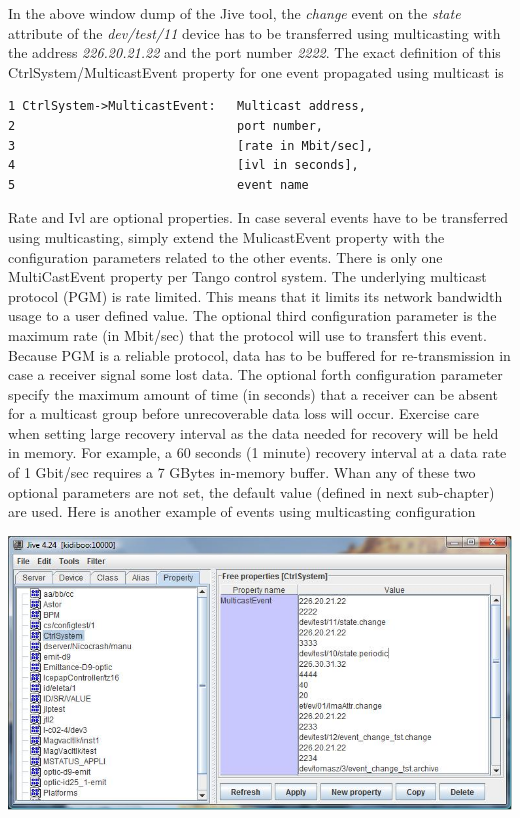 In the above window dump of the Jive tool, the \emph{change} event
on the \emph{state} attribute of the \emph{dev/test/11} device has
to be transferred using multicasting with the address \emph{226.20.21.22}
and the port number \emph{2222}. The exact definition of this CtrlSystem/MulticastEvent
property for one event propagated using multicast is


\begin{verbatim}
1 CtrlSystem->MulticastEvent:   Multicast address,
2                               port number,
3                               [rate in Mbit/sec],
4                               [ivl in seconds],
5                               event name
\end{verbatim}


Rate and Ivl are optional properties. In
case several events have to be transferred using multicasting, simply
extend the MulicastEvent property with the configuration parameters
related to the other events. There is only one MultiCastEvent property
per Tango control system. The underlying multicast protocol (PGM)
is rate limited. This means that it limits its network bandwidth usage
to a user defined value. The optional third configuration parameter
is the maximum rate (in Mbit/sec) that the protocol will use to transfert
this event. Because PGM is a reliable protocol, data has to be buffered
for re-transmission in case a receiver signal some lost data. The
optional forth configuration parameter specify the maximum amount
of time (in seconds) that a receiver can be absent for a multicast
group before unrecoverable data loss will occur. Exercise care when
setting large recovery interval as the data needed for recovery will
be held in memory. For example, a 60 seconds (1 minute) recovery interval
at a data rate of 1 Gbit/sec requires a 7 GBytes in-memory buffer.
Whan any of these two optional parameters are not set, the default
value (defined in next sub-chapter) are used. Here is another example
of events using multicasting configuration\begin{center}\includegraphics[scale=0.7]{advanced/jive_sophis}\end{center}
